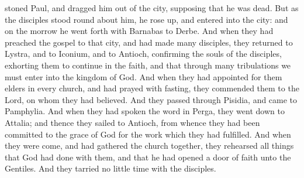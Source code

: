 stoned Paul, and dragged him out of the city, supposing that he was dead. But as the disciples stood round about him, he rose up, and entered into the city: and on the morrow he went forth with Barnabas to Derbe. And when they had preached the gospel to that city, and had made many disciples, they returned to Lystra, and to Iconium, and to Antioch, confirming the souls of the disciples, exhorting them to continue in the faith, and that through many tribulations we must enter into the kingdom of God. And when they had appointed for them elders in every church, and had prayed with fasting, they commended them to the Lord, on whom they had believed. And they passed through Pisidia, and came to Pamphylia. And when they had spoken the word in Perga, they went down to Attalia; and thence they sailed to Antioch, from whence they had been committed to the grace of God for the work which they had fulfilled. And when they were come, and had gathered the church together, they rehearsed all things that God had done with them, and that he had opened a door of faith unto the Gentiles. And they tarried no little time with the disciples. 

